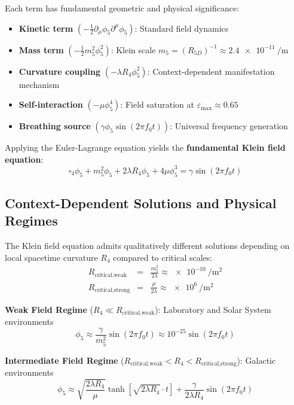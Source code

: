 \documentclass[12pt]{iopart}
\newcommand{\phifive}{\phi_5}
\newcommand{\epsmax}{\varepsilon_{\text{max}}}
\newcommand{\fzero}{f_0}
\newcommand{\Rfive}{R_{5D}}
\newcommand{\Rfour}{R_4}
\newcommand{\dalembertian}{\square_4}
\begin{document}
Each term has fundamental geometric and physical significance:
\begin{itemize}
\item \textbf{Kinetic term} $(-\frac{1}{2} \partial_\mu\phifive \partial^\mu\phifive)$: Standard field dynamics
\item \textbf{Mass term} $(-\frac{1}{2}m_5^2\phifive^2)$: Klein scale $m_5 = (\Rfive)^{-1} \approx \SI{2.4e-11}{\per\meter}$
\item \textbf{Curvature coupling} $(-\lambda\Rfour\phifive^2)$: Context-dependent manifestation mechanism
\item \textbf{Self-interaction} $(-\mu\phifive^4)$: Field saturation at $\epsmax \approx 0.65$
\item \textbf{Breathing source} $(\gamma\phifive \sin(2\pi\fzero t))$: Universal frequency generation
\end{itemize}

Applying the Euler-Lagrange equation yields the \textbf{fundamental Klein field equation}:
\begin{equation}
\dalembertian\phifive + m_5^2\phifive + 2\lambda\Rfour\phifive + 4\mu\phifive^3 = \gamma \sin(2\pi\fzero t)
\label{eq:klein_field_equation}
\end{equation}

\subsection{Context-Dependent Solutions and Physical Regimes}

The Klein field equation admits qualitatively different solutions depending on local spacetime curvature $\Rfour$ compared to critical scales:
\begin{eqnarray}
R_{\text{critical,weak}} &=& \frac{m_5^2}{2\lambda} \approx \SI{e-10}{\per\meter\squared} \\
R_{\text{critical,strong}} &=& \frac{\mu}{2\lambda} \approx \SI{e6}{\per\meter\squared}
\end{eqnarray}

\textbf{Weak Field Regime} ($\Rfour \ll R_{\text{critical,weak}}$): Laboratory and Solar System environments
\begin{equation}
\phifive \approx \frac{\gamma}{m_5^2} \sin(2\pi\fzero t) \approx 10^{-25} \sin(2\pi\fzero t)
\end{equation}

\textbf{Intermediate Field Regime} ($R_{\text{critical,weak}} < \Rfour < R_{\text{critical,strong}}$): Galactic environments
\begin{equation}
\phifive \approx \sqrt{\frac{2\lambda\Rfour}{\mu}} \tanh[\sqrt{2\lambda\Rfour} \cdot t] + \frac{\gamma}{2\lambda\Rfour} \sin(2\pi\fzero t)
\end{equation}
\end{document}

